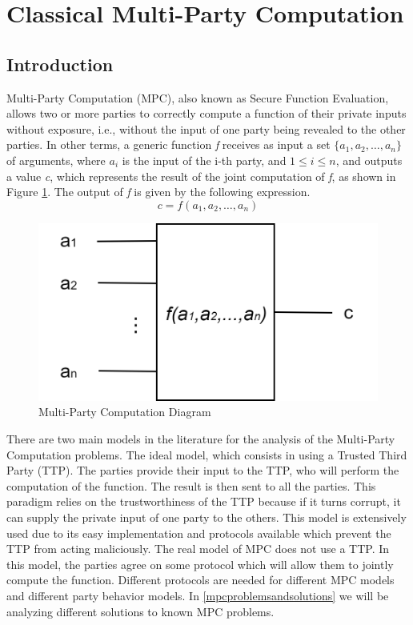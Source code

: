 \section{Classical Multi-Party Computation}

\begin{refsection}

\subsection{Introduction}
Multi-Party Computation (MPC), also known as Secure Function Evaluation, allows two or more parties
to correctly compute a function of their private inputs without exposure, i.e., without
the input of one party being revealed to the other parties.
In other terms, a generic function \textit{f} receives as input a set $\{a_1,a_2,\dots,a_n\}$
of arguments, where $a_i$ is the input of the i-th party, and $1\leq i\leq n$, and outputs a value \textit{c}, which represents the result
of the joint computation of \textit{f}, as shown in Figure \ref{fig:mpcscheme}.
The output of \textit{f} is given by the following expression.
\begin{equation}\label{eq:mpc}
c = f(a_1,a_2,\dots,a_n)
\end{equation}

\renewcommand{\figurename}{Figure}
\begin{figure}[H]
\centering
\includegraphics[width=.4\linewidth]{./sdf/classical_mpc/figures/mpc_scheme}
\caption{Multi-Party Computation Diagram}
\label{fig:mpcscheme}
\end{figure}

There are two main models in the literature for the analysis of the Multi-Party Computation problems. The ideal model, which consists in using a Trusted Third Party (TTP). The parties provide their input to the TTP, who will perform the computation of the function. The result is then sent to all the parties. This paradigm relies on the trustworthiness of the TTP because if it turns corrupt, it can supply the private input of one party to the others. This model is extensively used due to its easy implementation and protocols available which prevent the TTP from acting maliciously. The real model of MPC does not use a TTP. In this model, the parties agree on some protocol which will allow them to jointly compute the function. Different protocols are needed for different MPC models and different party behavior models. In \ref{mpcproblemsandsolutions} we will be analyzing different solutions to known MPC problems.


\end{refsection}
